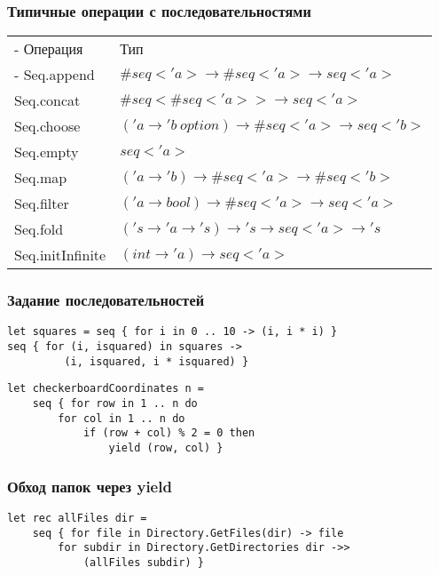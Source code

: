 \documentclass[xetex,mathserif,serif]{beamer}
\begin{document}
	\begin{frame}
		\frametitle{Типичные операции с последовательностями}
		\begin{small}
			\begin{tabu} {| X[0.5 l p] | X[1 l p] |}
				\tabucline-
				Операция                               & Тип                    \\
				\tabucline-
				\everyrow{\tabucline-}
				Seq.append                    & $\#seq<'a> \to \#seq<'a> \to seq<'a>$ \\
				Seq.concat                    & $\#seq<\#seq<'a>> \to seq<'a>$ \\
				Seq.choose                    & $('a \to 'b\ option) \to \#seq<'a> \to seq<'b>$ \\
				Seq.empty                     & $seq<'a>$ \\
				Seq.map                       & $('a \to 'b) \to \#seq<'a> \to \#seq<'b>$ \\
				Seq.filter                    & $('a \to bool) \to \#seq<'a> \to seq<'a>$ \\
				Seq.fold                      & $('s \to 'a \to 's) \to 's \to seq<'a> \to 's$ \\
				Seq.initInfinite              & $(int \to 'a) \to seq<'a>$ \\
			\end{tabu}
		\end{small}
	\end{frame}

	\begin{frame}[fragile]
		\frametitle{Задание последовательностей}
		\begin{verbatim}
let squares = seq { for i in 0 .. 10 -> (i, i * i) }
seq { for (i, isquared) in squares -> 
         (i, isquared, i * isquared) }
		\end{verbatim}

		\begin{verbatim}
let checkerboardCoordinates n =
    seq { for row in 1 .. n do
        for col in 1 .. n do
            if (row + col) % 2 = 0 then
                yield (row, col) }
		\end{verbatim}
	\end{frame}

	\begin{frame}[fragile]
		\frametitle{Обход папок через yield}
		\begin{verbatim}
let rec allFiles dir =
    seq { for file in Directory.GetFiles(dir) -> file
        for subdir in Directory.GetDirectories dir ->> 
            (allFiles subdir) }
		\end{verbatim}
	\end{frame}
\end{document}
